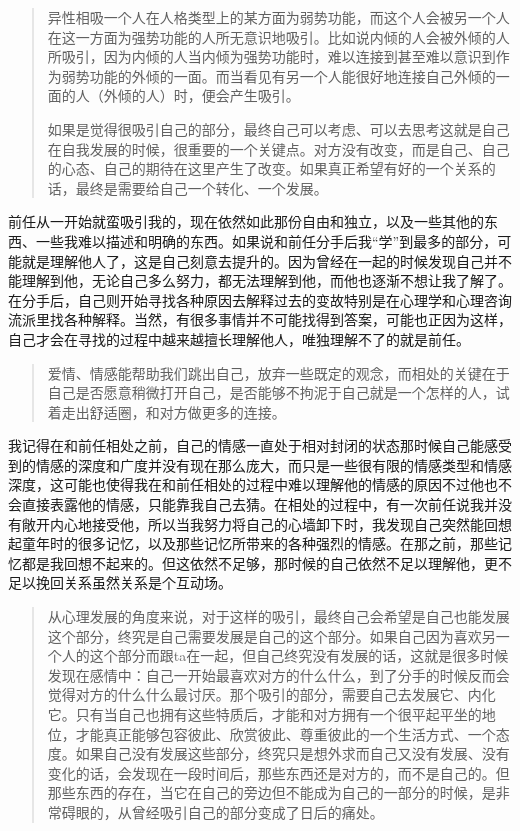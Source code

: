 \blockquote{
	异性相吸\pozhehao{}一个人在人格类型上的某方面为弱势功能，而这个人会被另一个人在这一方面为强势功能的人所无意识地吸引。比如说内倾的人会被外倾的人所吸引，因为内倾的人当内倾为强势功能时，难以连接到甚至难以意识到作为弱势功能的外倾的一面。而当看见有另一个人能很好地连接自己外倾的一面的人（外倾的人）时，便会产生吸引。

	如果是觉得很吸引自己的部分，最终自己可以考虑、可以去思考这就是自己在自我发展的时候，很重要的一个关键点。对方没有改变，而是自己、自己的心态、自己的期待在这里产生了改变。如果真正希望有好的一个关系的话，最终是需要给自己一个转化、一个发展。

}

前任从一开始就蛮吸引我的，现在依然如此\pozhehao{}那份自由和独立，以及一些其他的东西、一些我难以描述和明确的东西。如果说和前任分手后我“学”到最多的部分，可能就是理解他人了，这是自己刻意去提升的。因为曾经在一起的时候发现自己并不能理解到他，无论自己多么努力，都无法理解到他，而他也逐渐不想让我了解了。在分手后，自己则开始寻找各种原因去解释过去的变故\pozhehao{}特别是在心理学和心理咨询流派里找各种解释。当然，有很多事情并不可能找得到答案，可能也正因为这样，自己才会在寻找的过程中越来越擅长理解他人，唯独理解不了的就是前任。

\blockquote{
	爱情、情感能帮助我们跳出自己，放弃一些既定的观念，而相处的关键在于自己是否愿意稍微打开自己，是否能够不拘泥于自己就是一个怎样的人，试着走出舒适圈，和对方做更多的连接。

}

我记得在和前任相处之前，自己的情感一直处于相对封闭的状态\pozhehao{}那时候自己能感受到的情感的深度和广度并没有现在那么庞大，而只是一些很有限的情感类型和情感深度，这可能也使得我在和前任相处的过程中难以理解他的情感的原因\pozhehao{}不过他也不会直接表露他的情感，只能靠我自己去猜。在相处的过程中，有一次前任说我并没有敞开内心地接受他，所以当我努力将自己的心墙卸下时，我发现自己突然能回想起童年时的很多记忆，以及那些记忆所带来的各种强烈的情感。在那之前，那些记忆都是我回想不起来的。但这依然不足够，那时候的自己依然不足以理解他，更不足以挽回关系\pozhehao{}虽然关系是个互动场。

\blockquote{
	从心理发展的角度来说，对于这样的吸引，最终自己会希望是自己也能发展这个部分，终究是自己需要发展是自己的这个部分。如果自己因为喜欢另一个人的这个部分而跟ta在一起，但自己终究没有发展的话，这就是很多时候发现在感情中：自己一开始最喜欢对方的什么什么，到了分手的时候反而会觉得对方的什么什么最讨厌。那个吸引的部分，需要自己去发展它、内化它。只有当自己也拥有这些特质后，才能和对方拥有一个很平起平坐的地位，才能真正能够包容彼此、欣赏彼此、尊重彼此的一个生活方式、一个态度。如果自己没有发展这些部分，终究只是想外求而自己又没有发展、没有变化的话，会发现在一段时间后，那些东西还是对方的，而不是自己的。但那些东西的存在，当它在自己的旁边但不能成为自己的一部分的时候，是非常碍眼的，从曾经吸引自己的部分变成了日后的痛处。

}


